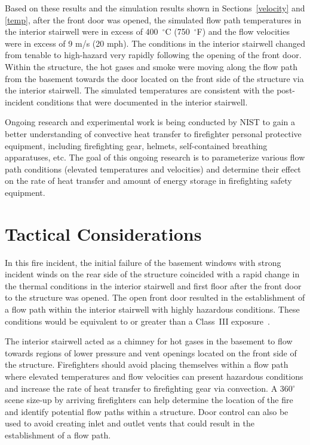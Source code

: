 \documentclass[12pt,oneside]{book}
\begin{document}
Based on these results and the simulation results shown in Sections~\ref{velocity} and \ref{temp}, after the front door was opened, the simulated flow path temperatures in the interior stairwell were in excess of 400~$^{\circ}$C (750~$^{\circ}$F) and the flow velocities were in excess of 9 m/s (20 mph). The conditions in the interior stairwell changed from tenable to high-hazard very rapidly following the opening of the front door. Within the structure, the hot gases and smoke were moving along the flow path from the basement towards the door located on the front side of the structure via the interior stairwell. The simulated temperatures are consistent with the post-incident conditions that were documented in the interior stairwell.

Ongoing research and experimental work is being conducted by NIST to gain a better understanding of convective heat transfer to firefighter personal protective equipment, including firefighting gear, helmets, self-contained breathing apparatuses, etc. The goal of this ongoing research is to parameterize various flow path conditions (elevated temperatures and velocities) and determine their effect on the rate of heat transfer and amount of energy storage in firefighting safety equipment.

\clearpage

\section{Tactical Considerations}
\label{tactical_considerations}

In this fire incident, the initial failure of the basement windows with strong incident winds on the rear side of the structure coincided with a rapid change in the thermal conditions in the interior stairwell and first floor after the front door to the structure was opened. The open front door resulted in the establishment of a flow path within the interior stairwell with highly hazardous conditions. These conditions would be equivalent to or greater than a Class~III exposure~\cite{Donnelly2006}.

The interior stairwell acted as a chimney for hot gases in the basement to flow towards regions of lower pressure and vent openings located on the front side of the structure. Firefighters should avoid placing themselves within a flow path where elevated temperatures and flow velocities can present hazardous conditions and increase the rate of heat transfer to firefighting gear via convection. A 360$^\circ$ scene size-up by arriving firefighters can help determine the location of the fire and identify potential flow paths within a structure. Door control can also be used to avoid creating inlet and outlet vents that could result in the establishment of a flow path.
\end{document}
